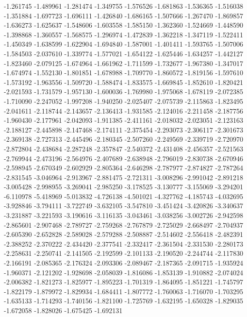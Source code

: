 -1.261745
-1.489961
-1.281474
-1.349755
-1.576526
-1.681863
-1.536365
-1.516038
-1.351884
-1.697723
-1.696111
-1.426840
-1.686165
-1.507666
-1.267470
-1.869857
-1.636273
-1.625637
-1.548606
-1.603558
-1.585150
-1.362360
-1.524669
-1.448590
-1.398868
-1.360557
-1.568575
-1.296974
-1.472839
-1.362218
-1.347119
-1.522411
-1.450349
-1.638599
-1.622904
-1.694840
-1.587001
-1.401411
-1.593765
-1.507006
-1.584503
-2.037610
-1.339774
-1.577021
-1.654122
-1.625446
-1.634257
-1.442127
-1.823460
-2.079125
-1.674964
-1.661962
-1.711599
-1.732677
-1.967380
-1.347017
-1.674974
-1.552130
-1.801851
-1.678988
-1.709770
-1.860572
-1.819156
-1.597610
-1.573192
-1.963556
-1.509720
-1.588474
-1.833575
-1.669845
-1.852610
-1.820421
-2.021593
-1.731579
-1.957130
-1.600036
-1.769980
-1.975068
-1.678119
-2.072385
-1.710090
-2.247052
-1.997208
-1.940250
-2.025407
-2.075739
-2.115863
-1.823495
-2.041611
-2.118744
-2.143657
-2.136413
-1.931585
-2.124016
-2.211458
-2.187756
-1.960430
-2.177961
-2.042093
-1.911385
-2.411161
-2.018032
-2.023051
-2.123163
-2.188127
-2.445898
-2.147468
-2.174111
-2.375454
-2.293073
-2.306117
-2.301673
-2.369138
-2.727313
-2.445496
-2.180345
-2.507260
-2.249569
-2.339719
-2.720970
-2.872804
-2.438684
-2.287248
-2.357847
-2.540372
-2.431408
-2.456357
-2.521563
-2.769944
-2.473196
-2.564976
-2.407689
-2.638948
-2.796019
-2.830738
-2.670946
-2.598945
-2.670349
-2.602929
-2.805364
-2.646298
-2.787977
-2.874827
-2.787264
-2.831545
-3.046964
-2.913967
-2.881475
-2.721311
-3.008296
-2.991042
-2.891218
-3.005428
-2.998955
-3.269041
-2.985250
-3.178525
-3.130777
-3.155069
-3.294201
-6.110978
-5.418969
-5.013832
-4.726138
-4.501021
-4.327762
-4.185743
-4.032695
-3.928846
-3.794111
-3.722749
-3.632105
-3.547810
-3.451424
-3.420826
-3.340637
-3.231887
-3.221593
-3.190616
-3.116135
-3.043461
-3.038256
-3.002726
-2.942598
-2.865601
-2.907468
-2.789727
-2.759268
-2.767879
-2.725029
-2.668497
-2.704937
-2.605390
-2.652828
-2.589028
-2.579288
-2.508887
-2.514602
-2.556418
-2.482391
-2.388252
-2.370222
-2.434420
-2.377541
-2.332417
-2.361504
-2.331530
-2.280173
-2.258631
-2.250741
-2.141505
-2.192599
-2.101133
-2.190520
-2.244744
-2.117830
-2.166191
-2.085365
-2.176324
-2.093306
-2.089467
-2.187365
-2.091715
-1.935924
-1.960371
-2.121202
-1.928698
-2.058039
-1.816086
-1.853139
-1.910882
-2.074024
-2.006382
-1.821273
-1.825977
-1.895223
-1.701319
-1.864095
-1.851221
-1.745797
-1.822179
-1.879972
-1.829934
-1.684411
-1.807772
-1.760063
-1.716070
-1.703295
-1.635133
-1.714293
-1.740156
-1.821100
-1.725769
-1.632195
-1.650328
-1.829035
-1.672058
-1.828026
-1.675425
-1.692131
